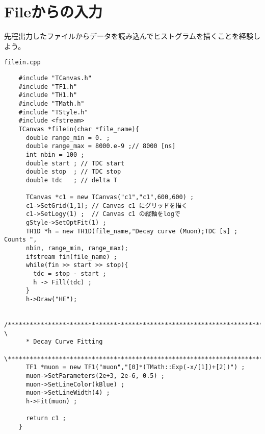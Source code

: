\clearpage
 \section{Fileからの入力}
 先程出力したファイルからデータを読み込んでヒストグラムを描くことを経験しよう。

 \begin{itembox}{\texttt{filein.cpp}}
\begin{verbatim}
	#include "TCanvas.h"
	#include "TF1.h"
	#include "TH1.h"
	#include "TMath.h"
	#include "TStyle.h"
	#include <fstream>
	TCanvas *filein(char *file_name){
	  double range_min = 0. ;
	  double range_max = 8000.e-9 ;// 8000 [ns]
	  int nbin = 100 ;  
	  double start ; // TDC start
	  double stop  ; // TDC stop
	  double tdc   ; // delta T

	  TCanvas *c1 = new TCanvas("c1","c1",600,600) ;
	  c1->SetGrid(1,1); // Canvas c1 にグリッドを描く
	  c1->SetLogy(1) ;  // Canvas c1 の縦軸をlogで
	  gStyle->SetOptFit(1) ;
	  TH1D *h = new TH1D(file_name,"Decay curve (Muon);TDC [s] ; Counts ",
	  nbin, range_min, range_max);
	  ifstream fin(file_name) ;
	  while(fin >> start >> stop){
	    tdc = stop - start ;
	    h -> Fill(tdc) ;
	  }
	  h->Draw("HE");

	  /******************************************************************************** \
	  * Decay Curve Fitting
	  \********************************************************************************/
	  TF1 *muon = new TF1("muon","[0]*(TMath::Exp(-x/[1])+[2])") ;
	  muon->SetParameters(2e+3, 2e-6, 0.5) ;
	  muon->SetLineColor(kBlue) ;
	  muon->SetLineWidth(4) ;
	  h->Fit(muon) ;

	  return c1 ;
	}
\end{verbatim}
 \end{itembox}